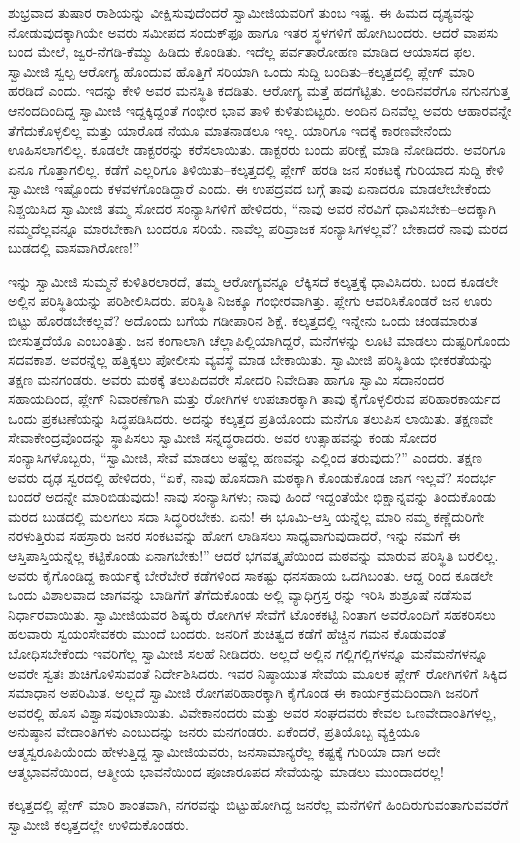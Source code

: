 ಶುಭ್ರವಾದ ತುಷಾರ ರಾಶಿಯನ್ನು ವೀಕ್ಷಿಸುವುದೆಂದರೆ ಸ್ವಾಮೀಜಿಯವರಿಗೆ ತುಂಬ ಇಷ್ಟ. ಈ ಹಿಮದ ದೃಶ್ಯವನ್ನು ನೋಡುವುದಕ್ಕಾಗಿಯೇ ಅವರು ಸಮೀಪದ ಸಂದುಕ್​ಫೂ ಹಾಗೂ ಇತರ ಸ್ಥಳಗಳಿಗೆ ಹೋಗಿಬಂದರು. ಆದರೆ ವಾಪಸು ಬಂದ ಮೇಲೆ, ಜ್ವರ-ನೆಗಡಿ-ಕೆಮ್ಮು ಹಿಡಿದು ಕೊಂಡಿತು. ಇದೆಲ್ಲ ಪರ್ವತಾರೋಹಣ ಮಾಡಿದ ಆಯಾಸದ ಫಲ. ಸ್ವಾಮೀಜಿ ಸ್ವಲ್ಪ ಆರೋಗ್ಯ ಹೊಂದುವ ಹೊತ್ತಿಗೆ ಸರಿಯಾಗಿ ಒಂದು ಸುದ್ದಿ ಬಂದಿತು–ಕಲ್ಕತ್ತದಲ್ಲಿ ಪ್ಲೇಗ್ ಮಾರಿ ಹರಡಿದೆ ಎಂದು. ಇದನ್ನು ಕೇಳಿ ಅವರ ಮನಸ್ಥಿತಿ ಕದಡಿತು. ಆರೋಗ್ಯ ಮತ್ತೆ ಹದಗೆಟ್ಟಿತು. ಅಂದಿನವರೆಗೂ ನಗುನಗುತ್ತ ಆನಂದದಿಂದಿದ್ದ ಸ್ವಾಮೀಜಿ ಇದ್ದಕ್ಕಿದ್ದಂತೆ ಗಂಭೀರ ಭಾವ ತಾಳಿ ಕುಳಿತುಬಿಟ್ಟರು. ಅಂದಿನ ದಿನವೆಲ್ಲ ಅವರು ಆಹಾರವನ್ನೇ ತೆಗೆದುಕೊಳ್ಳಲಿಲ್ಲ ಮತ್ತು ಯಾರೊಡ ನೆಯೂ ಮಾತನಾಡಲೂ ಇಲ್ಲ. ಯಾರಿಗೂ ಇದಕ್ಕೆ ಕಾರಣವೇನೆಂದು ಊಹಿಸಲಾಗಲಿಲ್ಲ. ಕೂಡಲೇ ಡಾಕ್ಟರರನ್ನು ಕರೆಸಲಾಯಿತು. ಡಾಕ್ಟರರು ಬಂದು ಪರೀಕ್ಷೆ ಮಾಡಿ ನೋಡಿದರು. ಅವರಿಗೂ ಏನೂ ಗೊತ್ತಾಗಲಿಲ್ಲ. ಕಡೆಗೆ ಎಲ್ಲರಿಗೂ ತಿಳಿಯಿತು–ಕಲ್ಕತ್ತದಲ್ಲಿ ಪ್ಲೇಗ್ ಹರಡಿ ಜನ ಸಂಕಟಕ್ಕೆ ಗುರಿಯಾದ ಸುದ್ದಿ ಕೇಳಿ ಸ್ವಾಮೀಜಿ ಇಷ್ಟೊಂದು ಕಳವಳಗೊಂಡಿದ್ದಾರೆ ಎಂದು. ಈ ಉಪದ್ರವದ ಬಗ್ಗೆ ತಾವು ಏನಾದರೂ ಮಾಡಲೇಬೇಕೆಂದು ನಿಶ್ಚಯಿಸಿದ ಸ್ವಾಮೀಜಿ ತಮ್ಮ ಸೋದರ ಸಂನ್ಯಾಸಿಗಳಿಗೆ ಹೇಳಿದರು, “ನಾವು ಅವರ ನೆರವಿಗೆ ಧಾವಿಸಬೇಕು–ಅದಕ್ಕಾಗಿ ನಮ್ಮದೆಲ್ಲವನ್ನೂ ಮಾರಬೇಕಾಗಿ ಬಂದರೂ ಸರಿಯೆ. ನಾವೆಲ್ಲ ಪರಿವ್ರಾಜಕ ಸಂನ್ಯಾಸಿಗಳಲ್ಲವೆ? ಬೇಕಾದರೆ ನಾವು ಮರದ ಬುಡದಲ್ಲಿ ವಾಸವಾಗಿರೋಣ!”

ಇನ್ನು ಸ್ವಾಮೀಜಿ ಸುಮ್ಮನೆ ಕುಳಿತಿರಲಾರದೆ, ತಮ್ಮ ಆರೋಗ್ಯವನ್ನೂ ಲೆಕ್ಕಿಸದೆ ಕಲ್ಕತ್ತಕ್ಕೆ ಧಾವಿಸಿದರು. ಬಂದ ಕೂಡಲೇ ಅಲ್ಲಿನ ಪರಿಸ್ಥಿತಿಯನ್ನು ಪರಿಶೀಲಿಸಿದರು. ಪರಿಸ್ಥಿತಿ ನಿಜಕ್ಕೂ ಗಂಭೀರವಾಗಿತ್ತು. ಪ್ಲೇಗು ಆವರಿಸಿಕೊಂಡರೆ ಜನ ಊರು ಬಿಟ್ಟು ಹೊರಡಬೇಕಲ್ಲವೆ? ಅದೊಂದು ಬಗೆಯ ಗಡೀಪಾರಿನ ಶಿಕ್ಷೆ. ಕಲ್ಕತ್ತದಲ್ಲಿ ಇನ್ನೇನು ಒಂದು ಚಂಡಮಾರುತ ಬೀಸುತ್ತದೆಯೊ ಎಂಬಂತಿತ್ತು. ಜನ ಕಂಗಾಲಾಗಿ ಚೆಲ್ಲಾಪಿಲ್ಲಿಯಾಗಿದ್ದರೆ, ಮನೆಗಳನ್ನು ಲೂಟಿ ಮಾಡಲು ದುಷ್ಟರಿಗೊಂದು ಸದವಕಾಶ. ಅವರನ್ನೆಲ್ಲ ಹತ್ತಿಕ್ಕಲು ಪೋಲೀಸು ವ್ಯವಸ್ಥೆ ಮಾಡ ಬೇಕಾಯಿತು. ಸ್ವಾಮೀಜಿ ಪರಿಸ್ಥಿತಿಯ ಭೀಕರತೆಯನ್ನು ತಕ್ಷಣ ಮನಗಂಡರು. ಅವರು ಮಠಕ್ಕೆ ತಲುಪಿದವರೇ ಸೋದರಿ ನಿವೇದಿತಾ ಹಾಗೂ ಸ್ವಾಮಿ ಸದಾನಂದರ ಸಹಾಯದಿಂದ, ಪ್ಲೇಗ್ ನಿವಾರಣೆಗಾಗಿ ಮತ್ತು ರೋಗಿಗಳ ಉಪಚಾರಕ್ಕಾಗಿ ತಾವು ಕೈಗೊಳ್ಳಲಿರುವ ಪರಿಹಾರಕಾರ್ಯದ ಒಂದು ಪ್ರಕಟಣೆಯನ್ನು ಸಿದ್ಧಪಡಿಸಿದರು. ಅದನ್ನು ಕಲ್ಕತ್ತದ ಪ್ರತಿಯೊಂದು ಮನೆಗೂ ತಲುಪಿಸ ಲಾಯಿತು. ತಕ್ಷಣವೇ ಸೇವಾಕೇಂದ್ರವೊಂದನ್ನು ಸ್ಥಾಪಿಸಲು ಸ್ವಾಮೀಜಿ ಸನ್ನದ್ಧರಾದರು. ಅವರ ಉತ್ಸಾಹವನ್ನು ಕಂಡು ಸೋದರ ಸಂನ್ಯಾಸಿಗಳೊಬ್ಬರು, “ಸ್ವಾಮೀಜಿ, ಸೇವೆ ಮಾಡಲು ಅಷ್ಟೆಲ್ಲ ಹಣವನ್ನು ಎಲ್ಲಿಂದ ತರುವುದು?” ಎಂದರು. ತಕ್ಷಣ ಅವರು ದೃಢ ಸ್ವರದಲ್ಲಿ ಹೇಳಿದರು, “ಏಕೆ, ನಾವು ಹೊಸದಾಗಿ ಮಠಕ್ಕಾಗಿ ಕೊಂಡುಕೊಂಡ ಜಾಗ ಇಲ್ಲವೆ? ಸಂದರ್ಭ ಬಂದರೆ ಅದನ್ನೇ ಮಾರಿಬಿಡುವುದು! ನಾವು ಸಂನ್ಯಾಸಿಗಳು; ನಾವು ಹಿಂದೆ ಇದ್ದಂತೆಯೇ ಭಿಕ್ಷಾನ್ನವನ್ನು ತಿಂದುಕೊಂಡು ಮರದ ಬುಡದಲ್ಲಿ ಮಲಗಲು ಸದಾ ಸಿದ್ಧರಿರಬೇಕು. ಏನು! ಈ ಭೂಮಿ-ಆಸ್ತಿ ಯನ್ನೆಲ್ಲ ಮಾರಿ ನಮ್ಮ ಕಣ್ಣೆದುರಿಗೇ ನರಳುತ್ತಿರುವ ಸಹಸ್ರಾರು ಜನರ ಸಂಕಟವನ್ನು ಹೋಗ ಲಾಡಿಸಲು ಸಾಧ್ಯವಾಗುವುದಾದರೆ, ಇನ್ನು ನಮಗೆ ಈ ಆಸ್ತಿಪಾಸ್ತಿಯನ್ನೆಲ್ಲ ಕಟ್ಟಿಕೊಂಡು ಏನಾಗಬೇಕು!” ಆದರೆ ಭಗವತ್ಕೃಪೆಯಿಂದ ಮಠವನ್ನು ಮಾರುವ ಪರಿಸ್ಥಿತಿ ಬರಲಿಲ್ಲ. ಅವರು ಕೈಗೊಂಡಿದ್ದ ಕಾರ್ಯಕ್ಕೆ ಬೇರೆಬೇರೆ ಕಡೆಗಳಿಂದ ಸಾಕಷ್ಟು ಧನಸಹಾಯ ಒದಗಿಬಂತು. ಆದ್ದ ರಿಂದ ಕೂಡಲೇ ಒಂದು ವಿಶಾಲವಾದ ಜಾಗವನ್ನು ಬಾಡಿಗೆಗೆ ತೆಗೆದುಕೊಂಡು ಅಲ್ಲಿ ವ್ಯಾಧಿಗ್ರಸ್ತ ರನ್ನು ಇರಿಸಿ ಶುಶ್ರೂಷೆ ನಡೆಸುವ ನಿರ್ಧಾರವಾಯಿತು. ಸ್ವಾಮೀಜಿಯವರ ಶಿಷ್ಯರು ರೋಗಿಗಳ ಸೇವೆಗೆ ಟೊಂಕಕಟ್ಟಿ ನಿಂತಾಗ ಅವರೊಂದಿಗೆ ಸಹಕರಿಸಲು ಹಲವಾರು ಸ್ವಯಂಸೇವಕರು ಮುಂದೆ ಬಂದರು. ಜನರಿಗೆ ಶುಚಿತ್ವದ ಕಡೆಗೆ ಹೆಚ್ಚಿನ ಗಮನ ಕೊಡುವಂತೆ ಬೋಧಿಸಬೇಕೆಂದು ಇವರಿಗೆಲ್ಲ ಸ್ವಾಮೀಜಿ ಸಲಹೆ ನೀಡಿದರು. ಅಲ್ಲದೆ ಅಲ್ಲಿನ ಗಲ್ಲಿಗಲ್ಲಿಗಳನ್ನೂ ಮನೆಮನೆಗಳನ್ನೂ ಅವರೇ ಸ್ವತಃ ಶುಚಿಗೊಳಿಸುವಂತೆ ನಿರ್ದೇಶಿಸಿದರು. ಇವರ ನಿಷ್ಠಾಯುತ ಸೇವೆಯ ಮೂಲಕ ಪ್ಲೇಗ್ ರೋಗಿಗಳಿಗೆ ಸಿಕ್ಕಿದ ಸಮಾಧಾನ ಅಪರಿಮಿತ. ಅಲ್ಲದೆ ಸ್ವಾಮೀಜಿ ರೋಗಪರಿಹಾರಕ್ಕಾಗಿ ಕೈಗೊಂಡ ಈ ಕಾರ್ಯಕ್ರಮದಿಂದಾಗಿ ಜನರಿಗೆ ಅವರಲ್ಲಿ ಹೊಸ ವಿಶ್ವಾಸವುಂಟಾಯಿತು. ವಿವೇಕಾನಂದರು ಮತ್ತು ಅವರ ಸಂಘದವರು ಕೇವಲ ಒಣವೇದಾಂತಿಗಳಲ್ಲ, ಅನುಷ್ಠಾನ ವೇದಾಂತಿಗಳು ಎಂಬುದನ್ನು ಜನರು ಮನಗಂಡರು. ಏಕೆಂದರೆ, ಪ್ರತಿಯೊಬ್ಬ ವ್ಯಕ್ತಿಯೂ ಆತ್ಮಸ್ವರೂಪಿಯೆಂದು ಹೇಳುತ್ತಿದ್ದ ಸ್ವಾಮೀಜಿಯವರು, ಜನಸಾಮಾನ್ಯರೆಲ್ಲ ಕಷ್ಟಕ್ಕೆ ಗುರಿಯಾ ದಾಗ ಅದೇ ಆತ್ಮಭಾವನೆಯಿಂದ, ಆತ್ಮೀಯ ಭಾವನೆಯಿಂದ ಪೂಜಾರೂಪದ ಸೇವೆಯನ್ನು ಮಾಡಲು ಮುಂದಾದರಲ್ಲ!

ಕಲ್ಕತ್ತದಲ್ಲಿ ಪ್ಲೇಗ್ ಮಾರಿ ಶಾಂತವಾಗಿ, ನಗರವನ್ನು ಬಿಟ್ಟುಹೋಗಿದ್ದ ಜನರೆಲ್ಲ ಮನೆಗಳಿಗೆ ಹಿಂದಿರುಗುವಂತಾಗುವವರೆಗೆ ಸ್ವಾಮೀಜಿ ಕಲ್ಕತ್ತದಲ್ಲೇ ಉಳಿದುಕೊಂಡರು.


